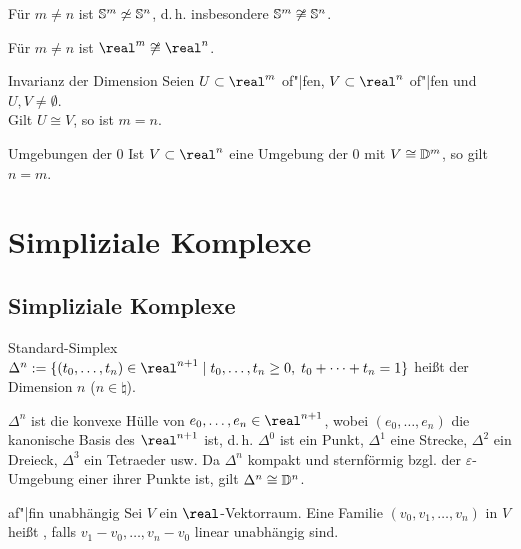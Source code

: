 \begin{Kor}
    Für $m \not= n$ ist $\mathbb{S}^m \not\simeq \mathbb{S}^n$, d.\,h.
    insbesondere $\mathbb{S}^m \not\cong \mathbb{S}^n$.
\end{Kor}

\begin{Kor}
    Für $m \not= n$ ist $\real^m \not\cong \real^n$.
\end{Kor}

\begin{Satz}{Invarianz der Dimension}
    Seien $U \subset \real^m$ of"|fen, $V \subset \real^n$ of"|fen und
    $U, V \not= \emptyset$. \\
    Gilt $U \cong V$, so ist $m = n$.
\end{Satz}

\begin{Lemma}{Umgebungen der $0$}
    Ist $V \subset \real^n$ eine Umgebung der $0$ mit $V \cong \mathbb{D}^m$,
    so gilt $n = m$.
\end{Lemma}

\pagebreak

\section{%
    Simpliziale Komplexe%
}

\subsection{%
    Simpliziale Komplexe%
}

\begin{Def}{Standard-Simplex}
    $\Delta^n := \{(t_0, \dotsc, t_n) \in \real^{n+1} \;|\;
    t_0, \dotsc, t_n \ge 0,\; t_0 + \dotsb + t_n = 1\}$ heißt
     der Dimension $n$ ($n \in \natural$).
\end{Def}

\begin{Bem}
    $\Delta^n$ ist die konvexe Hülle von $e_0, \dotsc, e_n \in \real^{n+1}$,
    wobei $(e_0, \dotsc, e_n)$ die kanonische Basis des $\real^{n+1}$ ist,
    d.\,h. $\Delta^0$ ist ein Punkt, $\Delta^1$ eine Strecke,
    $\Delta^2$ ein Dreieck, $\Delta^3$ ein Tetraeder usw.
    Da $\Delta^n$ kompakt und sternförmig bzgl. der $\varepsilon$-Umgebung
    einer ihrer Punkte ist, gilt $\Delta^n \cong \mathbb{D}^n$.
\end{Bem}

\begin{Def}{af"|fin unabhängig}
    Sei $V$ ein $\real$-Vektorraum.
    Eine Familie $(v_0, v_1, \dotsc, v_n)$ in $V$ heißt
    , falls $v_1 - v_0, \dotsc, v_n - v_0$
    linear unabhängig sind.
\end{Def}


